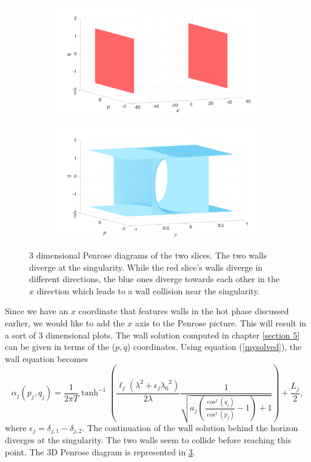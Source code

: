 \begin{figure}
    \centering
    \begin{subfigure}[b]{0.45\textwidth}
        \centering
        \includegraphics[width=\textwidth]{figures/pen3dred.png}
        \caption{}
        \label{penrosered}
    \end{subfigure}
    \hfill
    \begin{subfigure}[b]{0.45\textwidth}
        \centering
        \includegraphics[width=\textwidth]{figures/pen3dblue.png}
        \caption{}
        \label{penroseblue}
    \end{subfigure}
    \caption{3 dimensional Penrose diagrams of the two slices. The two walls diverge at the singularity. While the red slice's walls diverge in different directions, the blue ones diverge towards each other in the $x$ direction which leads to a wall collision near the singularity.}
    \label{penrose3d}
\end{figure}

Since we have an $x$ coordinate that features walls in the hot phase discussed earlier, we would like to add the $x$ axis to the Penrose picture. This will result in a sort of 3 dimensional plots. The wall solution computed in chapter \ref{section 5} can be given in terms of the ($p,q$) coordinates. Using equation (\ref{mysolved}), the wall equation becomes
\begin{equation}\label{l7it dial Penrose}
    \alpha_j(p_j,q_j) = \frac{1}{2\pi T}\tanh^{-1}\left(\frac{\ell_j\left(\lambda^2+\epsilon_j{\lambda_0}^2\right)}{2\lambda}\frac{1}{\sqrt{a_j\left(\frac{\cos^2(q_j)}{\cos^2(p_j)}-1\right)+1}}\right) + \frac{L_j}{2},
\end{equation}
where $\epsilon_j=\delta_{j,1}-\delta_{j,2}$. The continuation of the wall solution behind the horizon diverges at the singularity. The two walls seem to collide before reaching this point. The 3D Penrose diagram is represented in \ref{penrose3d}.

